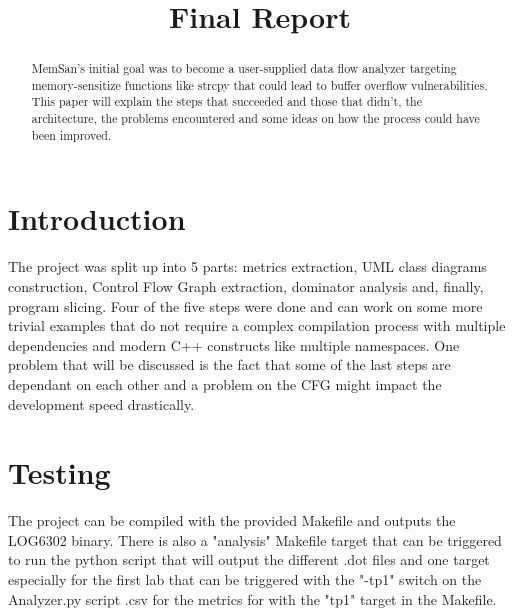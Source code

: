 \documentclass[conference,compsoc]{IEEEtran}
\begin{document}
\title{Final Report}

\author{
}

\maketitle
\begin{abstract}
MemSan's initial goal was to become a user-supplied data flow analyzer targeting memory-sensitize functions like strcpy that could lead to buffer overflow vulnerabilities. This paper will explain the steps that succeeded and those that didn't, the architecture, the problems encountered and some ideas on how the process could have been improved.
\end{abstract}

\IEEEpeerreviewmaketitle



\section{Introduction}

The project was split up into 5 parts: metrics extraction, UML class diagrams construction, Control Flow Graph extraction, dominator analysis and, 
finally, program slicing. Four of the five steps were done and can work on some more trivial examples that do not require a complex compilation process
 with multiple dependencies and modern C++ constructs like multiple namespaces. One problem that will be discussed is the fact that some of the last steps
 are dependant on each other and a problem on the CFG might impact the development speed drastically.

\section{Testing}
The project can be compiled with the provided Makefile and outputs the LOG6302 binary.
 There is also a "analysis" Makefile target that can be triggered to run the python script that will output the
 different .dot files and one target especially for the first lab that can be triggered with the "-tp1" switch on the Analyzer.py script 
.csv for the metrics for with the "tp1" target in the Makefile.
\end{document}
